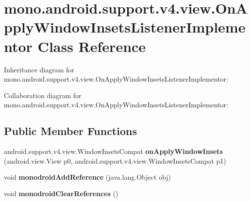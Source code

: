 \hypertarget{classmono_1_1android_1_1support_1_1v4_1_1view_1_1_on_apply_window_insets_listener_implementor}{}\section{mono.\+android.\+support.\+v4.\+view.\+On\+Apply\+Window\+Insets\+Listener\+Implementor Class Reference}
\label{classmono_1_1android_1_1support_1_1v4_1_1view_1_1_on_apply_window_insets_listener_implementor}


Inheritance diagram for mono.\+android.\+support.\+v4.\+view.\+On\+Apply\+Window\+Insets\+Listener\+Implementor\+:


Collaboration diagram for mono.\+android.\+support.\+v4.\+view.\+On\+Apply\+Window\+Insets\+Listener\+Implementor\+:
\subsection*{Public Member Functions}
\begin{DoxyCompactItemize}
\item 
\mbox{\label{classmono_1_1android_1_1support_1_1v4_1_1view_1_1_on_apply_window_insets_listener_implementor_a2230411e95dcf2d47b86e1b35d2e91ee}} 
android.\+support.\+v4.\+view.\+Window\+Insets\+Compat {\bfseries on\+Apply\+Window\+Insets} (android.\+view.\+View p0, android.\+support.\+v4.\+view.\+Window\+Insets\+Compat p1)
\item 
\mbox{\label{classmono_1_1android_1_1support_1_1v4_1_1view_1_1_on_apply_window_insets_listener_implementor_a1cc958285db59d60fb6eac2b1f8295ec}} 
void {\bfseries monodroid\+Add\+Reference} (java.\+lang.\+Object obj)
\item 
\mbox{\label{classmono_1_1android_1_1support_1_1v4_1_1view_1_1_on_apply_window_insets_listener_implementor_ac798280f8de141aa346f20a7cee58899}} 
void {\bfseries monodroid\+Clear\+References} ()
\end{DoxyCompactItemize}
